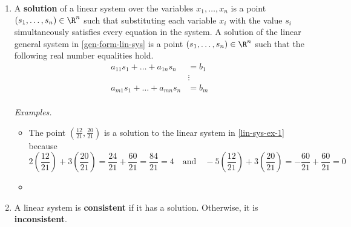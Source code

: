 \begin{enumerate}
  \textit{Examples.}
  \begin{itemize}
  \item
    The following matrix in $\R^{2 \by 2}$ is the coefficient matrix of
    the linear system in \ref{lin-sys-ex-1}.
    \begin{displaymath}
      \begin{bmatrix}
        2 & 3 \\
        -5 & 3
      \end{bmatrix}
    \end{displaymath}
  \item
    The following matrix in $\R^{3 \by 5}$ is the coefficient matrix of
    the linear system in \ref{lin-sys-ex-2}.
    \begin{displaymath}
      \begin{bmatrix}
        3 & -4.4 & 0 & 0 \\
        200 & 200 & 1 & 200 \\
        9 & -1 & 0 & -5
      \end{bmatrix}
    \end{displaymath}
  \end{itemize}
\item A \textbf{solution} of a linear system over the variables $x_1,
  \dots, x_n$ is a point $(s_1, \dots, s_n) \in \R^n$ such that
  substituting each variable $x_i$ with the value $s_i$ simultaneously
  satisfies every equation in the system.  A solution of the linear
  general system in \ref{gen-form-lin-sys} is a point $(s_1, \dots, s_n) \in
  \R^n$ such that the following real number equalities hold.
  \begin{align*}
    a_{11}s_1 + \dots + a_{1n} s_n &= b_1 \\
    &\vdots \\
    a_{m1}s_1 + \dots + a_{mn} s_n &= b_m \\
  \end{align*}

  \textit{Examples.}
  \begin{itemize}
  \item The point $\left(\frac{12}{21}, \frac{20}{21}\right)$ is a
    solution to the linear system in \ref{lin-sys-ex-1} because
    \begin{displaymath}
      2\left(\frac{12}{21}\right) + 3\left(\frac{20}{21}\right)
      = \frac{24}{21} + \frac{60}{21}
      = \frac{84}{21}
      = 4
      \quad
      \text{and}
      \quad
      -5\left(\frac{12}{21}\right) + 3\left(\frac{20}{21}\right)
      = -\frac{60}{21} + \frac{60}{21}
      = 0
    \end{displaymath}
  \item
  \end{itemize}
\item A linear system is \textbf{consistent} if it has a solution.
  Otherwise, it is \textbf{inconsistent}.


\end{enumerate}
